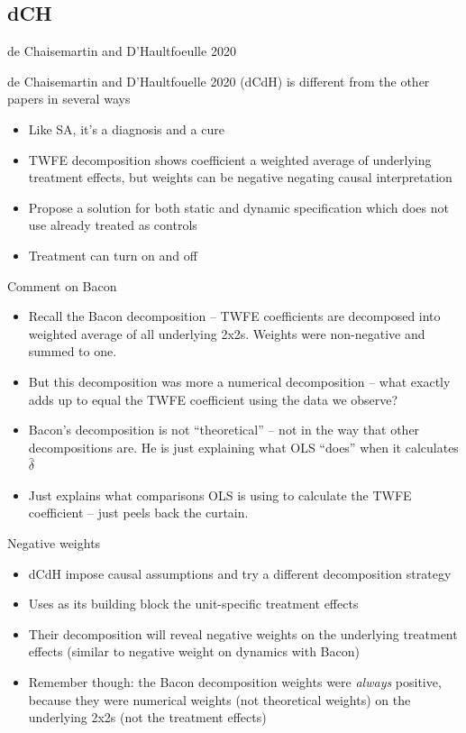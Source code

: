 \documentclass{beamer}
\begin{document}
\subsection{dCH}

\begin{frame}{de Chaisemartin and D'Haultfoeulle 2020}

de Chaisemartin and D'Haultfouelle 2020 (dCdH) is different from the other papers in several ways
	\begin{itemize}
	\item Like SA, it's a diagnosis and a cure
	\item TWFE decomposition shows coefficient a weighted average of underlying treatment effects, but weights can be negative negating causal interpretation
	\item Propose a solution for both static and dynamic specification which does not use already treated as controls
	\item Treatment can turn on and off
	\end{itemize}

\end{frame}


\begin{frame}{Comment on Bacon}

\begin{itemize}
\item Recall the Bacon decomposition -- TWFE coefficients are decomposed into weighted average of all underlying 2x2s. Weights were non-negative and summed to one.
\item But this decomposition was more a numerical decomposition -- what exactly adds up to equal the TWFE coefficient using the data we observe?
\item Bacon's decomposition is not ``theoretical'' -- not in the way that other decompositions are. He is just explaining what OLS ``does'' when it calculates $\widehat{\delta}$
\item Just explains what comparisons OLS is using to calculate the TWFE coefficient -- just peels back the curtain.
\end{itemize}

\end{frame}

\begin{frame}{Negative weights}

\begin{itemize}
\item dCdH impose causal assumptions and try a different decomposition strategy
\item Uses as its building block the unit-specific treatment effects
\item Their decomposition will reveal negative weights on the underlying treatment effects (similar to negative weight on dynamics with Bacon)
\item Remember though: the Bacon decomposition weights were \emph{always} positive, because they were numerical weights (not theoretical weights) on the underlying 2x2s (not the treatment effects)
\end{itemize}

\end{frame}
\end{document}
